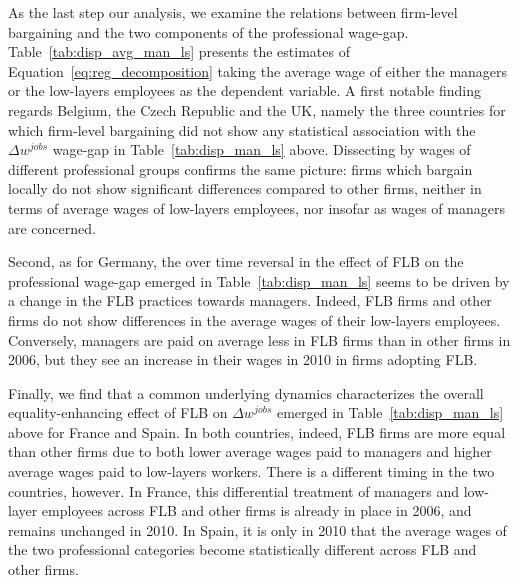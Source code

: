 \documentclass[12pt]{article}
\begin{document}
% 

As the last step our analysis, we examine the relations between
firm-level bargaining and the two components of the professional
wage-gap. Table~\ref{tab:disp_avg_man_ls} presents the estimates of
Equation~\ref{eq:reg_decomposition} taking the average wage of either
the managers or the low-layers employees as the dependent variable. A
first notable finding regards Belgium, the Czech Republic and the UK,
namely the three countries for which firm-level bargaining did not
show any statistical association with the $\Delta w^{jobs}$ wage-gap
in Table~\ref{tab:disp_man_ls} above. Dissecting by wages of different
professional groups confirms the same picture: firms which bargain
locally do not show significant differences compared to other firms,
neither in terms of average wages of low-layers employees, nor insofar
as wages of managers are concerned.

Second, as for Germany, the over time reversal in the effect of FLB on
the professional wage-gap emerged in Table~\ref{tab:disp_man_ls} seems
to be driven by a change in the FLB practices towards managers.
Indeed, FLB firms and other firms do not show differences in the
average wages of their low-layers employees. Conversely, managers are
paid on average less in FLB firms than in other firms in 2006, but
they see an increase in their wages in 2010 in firms adopting FLB.

Finally, we find that a common underlying dynamics characterizes the overall equality-enhancing effect of FLB on $\Delta w^{jobs}$ emerged in Table~\ref{tab:disp_man_ls} above for France and Spain. In both countries, indeed, FLB firms are more equal than other firms due to both lower average wages paid to managers and higher average wages paid to low-layers workers. There is a different timing in the two countries, however. In France, this differential treatment of managers and low-layer employees across FLB and other firms is already in place in 2006, and remains unchanged in 2010. In Spain, it is only in 2010 that the average wages of the two professional categories become statistically different across FLB and other firms.
\end{document}
